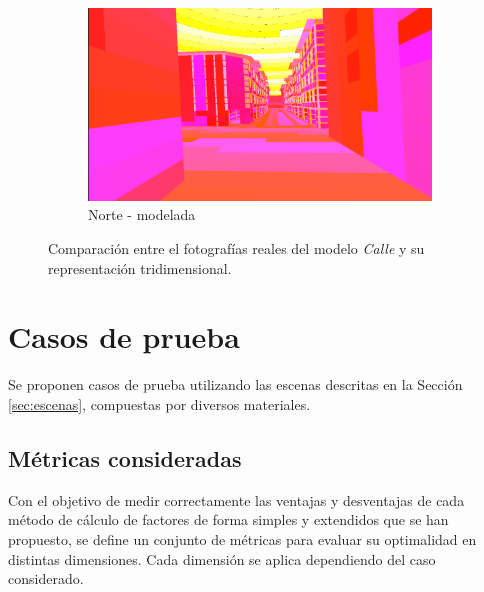 \begin{figure}[htbp]
\begin{subfigure}{0.475\textwidth}
		\includegraphics[width=1\linewidth]{assets/streetmodel2}
		\caption{Norte - modelada}
	\end{subfigure}
	\caption{Comparación entre el fotografías reales del modelo \textit{Calle} y su representación tridimensional.}
	\label{img:streetcomp}
\end{figure}

\section{Casos de prueba}
\label{sec:pruebas}

Se proponen casos de prueba utilizando las escenas descritas en la Sección \ref{sec:escenas}, compuestas por diversos materiales.

\subsection{Métricas consideradas}
\label{metricasestablecidas}
Con el objetivo de medir correctamente las ventajas y desventajas de cada método de cálculo de factores de forma simples y extendidos que se han propuesto, se define un conjunto de métricas para evaluar su optimalidad en distintas dimensiones. Cada dimensión se aplica dependiendo del caso considerado.

